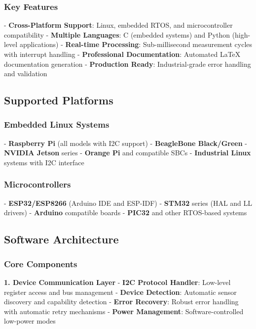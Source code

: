 \documentclass[11pt,a4paper]{article}
\begin{document}
\subsubsection{Key Features}

- \textbf{Cross-Platform Support}: Linux, embedded RTOS, and microcontroller compatibility
- \textbf{Multiple Languages}: C (embedded systems) and Python (high-level applications)  
- \textbf{Real-time Processing}: Sub-millisecond measurement cycles with interrupt handling
- \textbf{Professional Documentation}: Automated LaTeX documentation generation
- \textbf{Production Ready}: Industrial-grade error handling and validation

\subsection{Supported Platforms}

\subsubsection{Embedded Linux Systems}
- \textbf{Raspberry Pi} (all models with I2C support)
- \textbf{BeagleBone Black/Green} 
- \textbf{NVIDIA Jetson} series
- \textbf{Orange Pi} and compatible SBCs
- \textbf{Industrial Linux} systems with I2C interface

\subsubsection{Microcontrollers}
- \textbf{ESP32/ESP8266} (Arduino IDE and ESP-IDF)
- \textbf{STM32} series (HAL and LL drivers)
- \textbf{Arduino} compatible boards
- \textbf{PIC32} and other RTOS-based systems

\subsection{Software Architecture}

\subsubsection{Core Components}

\textbf{1. Device Communication Layer}
- \textbf{I2C Protocol Handler}: Low-level register access and bus management
- \textbf{Device Detection}: Automatic sensor discovery and capability detection
- \textbf{Error Recovery}: Robust error handling with automatic retry mechanisms
- \textbf{Power Management}: Software-controlled low-power modes
\end{document}
